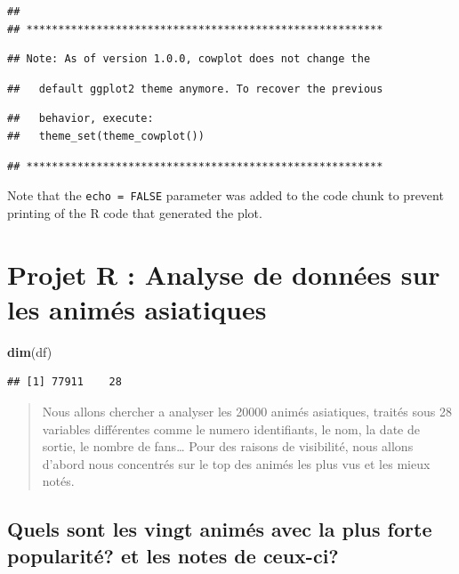 \documentclass[]{article}
\newenvironment{Shaded}{\begin{snugshade}}{\end{snugshade}}
\newcommand{\KeywordTok}[1]{\textcolor[rgb]{0.13,0.29,0.53}{\textbf{#1}}}
\newcommand{\NormalTok}[1]{#1}
\begin{document}
\begin{verbatim}
## 
## ********************************************************
\end{verbatim}

\begin{verbatim}
## Note: As of version 1.0.0, cowplot does not change the
\end{verbatim}

\begin{verbatim}
##   default ggplot2 theme anymore. To recover the previous
\end{verbatim}

\begin{verbatim}
##   behavior, execute:
##   theme_set(theme_cowplot())
\end{verbatim}

\begin{verbatim}
## ********************************************************
\end{verbatim}

Note that the \texttt{echo\ =\ FALSE} parameter was added to the code
chunk to prevent printing of the R code that generated the plot.

\hypertarget{projet-r-analyse-de-donnees-sur-les-animes-asiatiques}{%
\section{Projet R : Analyse de données sur les animés
asiatiques}\label{projet-r-analyse-de-donnees-sur-les-animes-asiatiques}}

\begin{Shaded}
\begin{Highlighting}[]
\KeywordTok{dim}\NormalTok{(df)}
\end{Highlighting}
\end{Shaded}

\begin{verbatim}
## [1] 77911    28
\end{verbatim}

\begin{quote}
Nous allons chercher a analyser les 20000 animés asiatiques, traités
sous 28 variables différentes comme le numero identifiants, le nom, la
date de sortie, le nombre de fans\ldots{} Pour des raisons de
visibilité, nous allons d'abord nous concentrés sur le top des animés
les plus vus et les mieux notés.
\end{quote}

\hypertarget{quels-sont-les-vingt-animes-avec-la-plus-forte-popularite-et-les-notes-de-ceux-ci}{%
\subsection{Quels sont les vingt animés avec la plus forte popularité?
et les notes de
ceux-ci?}\label{quels-sont-les-vingt-animes-avec-la-plus-forte-popularite-et-les-notes-de-ceux-ci}}
\end{document}
